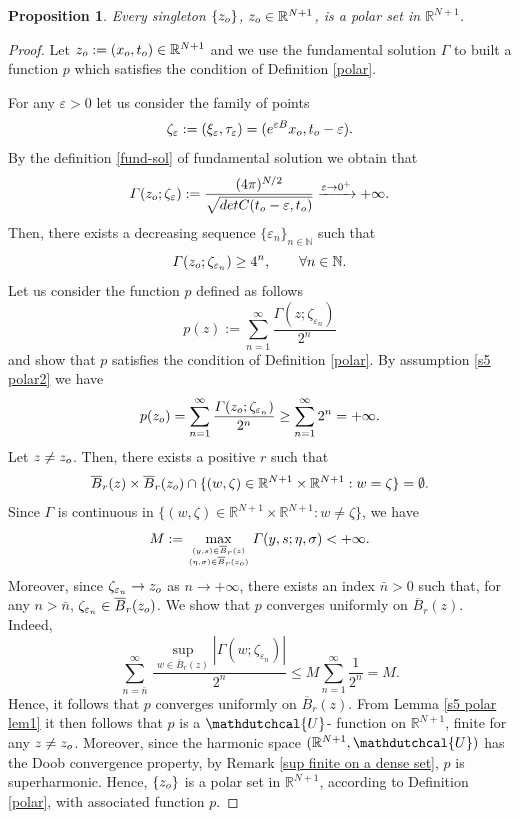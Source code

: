 \documentclass{amsart}
\newtheorem{prop}[thm]{Proposition}
\numberwithin{equation}{section}
\def \eps{{\varepsilon}}
\def \r{{\mathbb{R}}}
\def \Ud{{\mathdutchcal{U}}}
\renewcommand{\Gamma}{\varGamma}
\begin{document}
{\begin{prop}\label{s5 polar prop}
Every singleton $\{z_{\rm o}\}$, $z_{\rm o} \in \r^{N+1}$, is a polar set in $\r^{N+1}$.
\end{prop}
\begin{proof}
Let $z_{\rm o} :=(x_{\rm o},t_{\rm o}) \in \r^{N+1}$ and we use the fundamental solution $\Gamma$ to built a function $p$ which satisfies the condition of Definition \ref{polar}.

For any $\eps>0$ let us consider the family of points 
 $$
 \zeta_\eps:=(\xi_\eps,\tau_\eps)=(e^{\eps B}x_{\rm o},t_{\rm o}-\eps).
 $$ 
 By the definition \eqref{fund-sol} of fundamental solution we obtain that
$$
\Gamma(z_{\rm o};\zeta_\eps) := \frac{(4\pi)^{N/2}}{\sqrt{\textup{det}C(t_{\rm o}-\eps,t_{\rm o})}} \xrightarrow{\eps \rightarrow 0^+} +\infty.
$$
Then, there exists a decreasing sequence $\{\eps_n\}_{n \in \mathbb{N}}$ such that
\begin{equation}\label{s5 polar2}
\Gamma(z_{\rm o};\zeta_{\eps_n}) \geq 4^n, \qquad \forall n \in \mathbb{N}.
\end{equation}
Let us consider the function $p$ defined as follows
\begin{equation*}%
p(z) := \sum_{n =1}^\infty \frac{\Gamma(z;\zeta_{\eps_n})}{2^n}
\end{equation*}
and show that $p$ satisfies the condition of Definition \ref{polar}. By assumption \eqref{s5 polar2} we have
$$
p(z_{\rm o})= \sum_{n =1}^\infty \frac{\Gamma(z_{\rm o};\zeta_{\eps_n})}{2^n}\geq \sum_{n =1}^\infty 2^n = +\infty.
$$
Let $z \neq z_{\rm o}$. Then, there exists a positive $r$ such that
$$
\overline{B}_r(z) \times \overline{B}_r(z_{\rm o}) \cap \{(w,\zeta) \in \r^{N+1} \times \r^{N+1} : w = \zeta\} = \emptyset.
$$
Since $\Gamma$ is continuous in $\{(w,\zeta) \in \r^{N+1} \times \r^{N+1} : w \neq \zeta\}$, we have 
\begin{equation*}%
M:= \max_{(y,s) \in \overline{B}_r(z) \atop (\eta, \sigma) \in \overline{B}_r(z_{\rm o})}\Gamma(y,s;\eta,\sigma) < +\infty.
\end{equation*}
Moreover, since $\zeta_{\eps_n} \rightarrow z_{\rm o}$ as $n \rightarrow +\infty$, there exists an index $\bar{n}>0$ such that, for any $n > \bar{n}$, $\zeta_{\eps_n} \in \overline{B}_r(z_{\rm o})$.
We show that $p$ converges uniformly on $\overline{B}_r(z)$. Indeed, 
$$
\sum_{n =\bar{n}}^{\infty} \,\frac{ \sup_{w \in \overline{B}_r(z)}|\Gamma(w;\zeta_{\eps_n})|}{2^n} \leq M \sum_{n= 1}^{\infty}\frac{1}{2^n} =M.
$$
Hence, it follows that $p$ converges uniformly on $\overline{B}_r(z)$. From Lemma \ref{s5 polar lem1} it then follows that $p$ is a $\Ud$- function on $\r^{N+1}$, finite for any $z \neq z_{\rm o}$. Moreover, since the harmonic space $(\r^{N+1},\Ud)$ has the Doob convergence property, by Remark \ref{sup finite on a dense set}, $p$ is superharmonic. Hence, $\{z_{\rm o}\}$ is a polar set in $\r^{N+1}$, according to Definition \ref{polar}, with associated function $p$.

\end{proof}}
\end{document}
